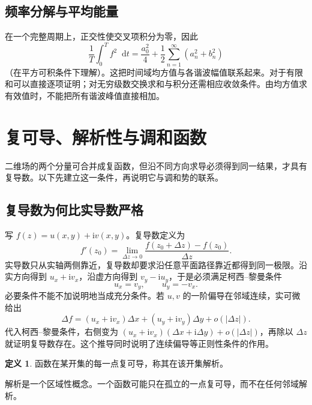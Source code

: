 \documentclass[11pt,openany,fontset=fandol]{ctexbook}
\theoremstyle{plain}\newtheorem{theorem}{定理}[chapter]\newtheorem{proposition}[theorem]{命题}
\theoremstyle{definition}\newtheorem{definition}{定义}[chapter]\newtheorem{example}{例}[chapter]
\theoremstyle{remark}\newtheorem*{remark}{说明}
\newcommand{\dd}{\mathop{}\!\mathrm d}\newcommand{\ii}{\mathrm i}\newcommand{\ee}{\mathrm e}
\begin{document}
\subsection{频率分解与平均能量}
在一个完整周期上，正交性使交叉项积分为零，因此
\[
\frac1T\int_0^Tf^2\dd t=\frac{a_0^2}{4}+\frac12\sum_{n=1}^{\infty}(a_n^2+b_n^2)
\]
（在平方可积条件下理解）。这把时间域均方值与各谐波幅值联系起来。对于有限和可以直接逐项证明；对无穷级数交换求和与积分还需相应收敛条件。由均方值求有效值时，不能把所有谐波峰值直接相加。

\section{复可导、解析性与调和函数}
二维场的两个分量可合并成复函数，但沿不同方向求导必须得到同一结果，才具有复导数。以下先建立这一条件，再说明它与调和势的联系。

\subsection{复导数为何比实导数严格}
写 $f(z)=u(x,y)+\ii v(x,y)$。复导数定义为
\begin{equation}
f'(z_0)=\lim_{\Delta z\to0}\frac{f(z_0+\Delta z)-f(z_0)}{\Delta z}.
\end{equation}
实导数只从实轴两侧靠近，复导数却要求沿任意平面路径靠近都得到同一极限。沿实方向得到 $u_x+\ii v_x$，沿虚方向得到 $v_y-\ii u_y$，于是必须满足柯西--黎曼条件
\begin{equation}
u_x=v_y,\qquad u_y=-v_x.
\end{equation}
必要条件不能不加说明地当成充分条件。若 $u,v$ 的一阶偏导在邻域连续，实可微给出
\[
\Delta f=(u_x+\ii v_x)\Delta x+(u_y+\ii v_y)\Delta y+o(|\Delta z|).
\]
代入柯西--黎曼条件，右侧变为 $(u_x+\ii v_x)(\Delta x+\ii\Delta y)+o(|\Delta z|)$，再除以 $\Delta z$ 就证明复导数存在。这个推导同时说明了连续偏导等正则性条件的作用。

\begin{definition}
函数在某开集的每一点复可导，称其在该开集解析。
\end{definition}
解析是一个区域性概念。一个函数可能只在孤立的一点复可导，而不在任何邻域解析。
\end{document}
